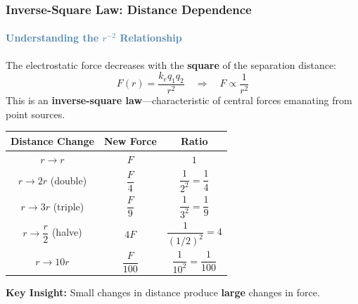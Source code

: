 \begin{frame}
\frametitle{\textsf{\textbf{Inverse-Square Law:} Distance Dependence}}
\framesubtitle{\textcolor{steelblue}{Understanding the $r^{-2}$ Relationship}}

\vspace{-0.05cm}

\begin{keybox}
\vspace{0.1cm}
The electrostatic force decreases with the \textbf{square} of the separation distance:
\begin{equation*}
F(r) = \frac{k_e q_1 q_2}{r^2} \quad \Rightarrow \quad F \propto \frac{1}{r^2}
\end{equation*}
This is an \textbf{inverse-square law}—characteristic of central forces emanating from point sources.
\end{keybox}

\vspace{0.3cm}

\begin{examplebox}
\vspace{0.1cm}

\begin{center}
\begin{tabular}{|c|c|c|}
\hline
\rowcolor{deepnavy!20}
\textbf{Distance Change} & \textbf{New Force} & \textbf{Ratio} \\
\hline
$r \rightarrow r$ & $F$ & $1$ \\
\hline
$r \rightarrow 2r$ (double) & $\dfrac{F}{4}$ & $\dfrac{1}{2^2} = \dfrac{1}{4}$ \\
\hline
$r \rightarrow 3r$ (triple) & $\dfrac{F}{9}$ & $\dfrac{1}{3^2} = \dfrac{1}{9}$ \\
\hline
$r \rightarrow \dfrac{r}{2}$ (halve) & $4F$ & $\dfrac{1}{(1/2)^2} = 4$ \\
\hline
$r \rightarrow 10r$ & $\dfrac{F}{100}$ & $\dfrac{1}{10^2} = \dfrac{1}{100}$ \\
\hline
\end{tabular}
\end{center}

\vspace{0.15cm}

\textbf{Key Insight:} Small changes in distance produce \textbf{large} changes in force.
\end{examplebox}


\end{frame}
